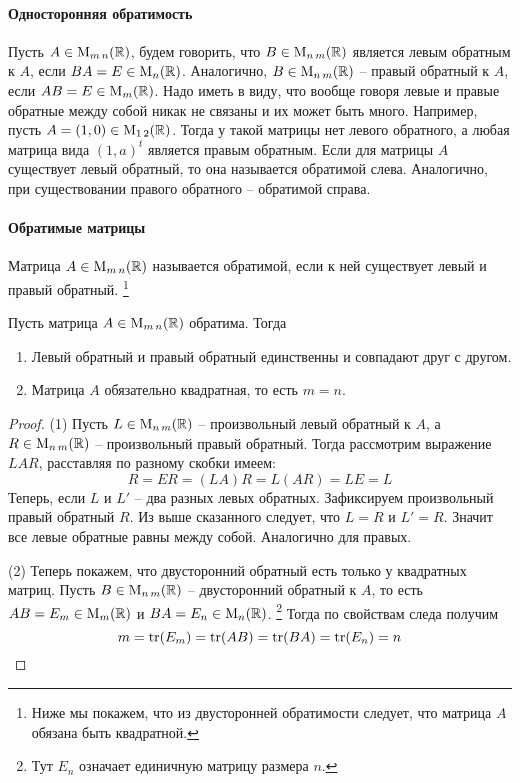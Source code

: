 \paragraph{Односторонняя обратимость}

Пусть $A\in\operatorname{M}_{m\,n}(\mathbb R)$, будем говорить, что $B\in\operatorname{M}_{n\,m}(\mathbb R)$ является левым обратным к $A$, если $BA = E\in\operatorname{M}_{n}(\mathbb R)$.
Аналогично, $B\in\operatorname{M}_{n\,m}(\mathbb R)$ -- правый обратный к $A$, если $AB = E\in\operatorname{M}_{m}(\mathbb R)$.
Надо иметь в виду, что вообще говоря левые и правые обратные между собой никак не связаны и их может быть много.
Например, пусть $A = (1, 0)\in\operatorname{M}_{1\,2}(\mathbb R)$.
Тогда у такой матрицы нет левого обратного, а любая матрица вида $(1, a)^t$ является правым обратным.
Если для матрицы $A$ существует левый обратный, то она называется обратимой слева.
Аналогично, при существовании правого обратного -- обратимой справа.

\paragraph{Обратимые матрицы}

Матрица $A\in\operatorname{M}_{m\,n}(\mathbb R)$ называется обратимой, если к ней существует левый и правый обратный.%
\footnote{Ниже мы покажем, что из двусторонней обратимости следует, что матрица $A$ обязана быть квадратной.}

\begin{claim}
Пусть матрица $A\in\operatorname{M}_{m\,n}(\mathbb R)$ обратима.
Тогда
\begin{enumerate}
\item Левый обратный и правый обратный единственны и совпадают друг с другом.

\item Матрица $A$ обязательно квадратная, то есть $m = n$.
\end{enumerate}
\end{claim}
\begin{proof}
(1) Пусть $L\in\operatorname{M}_{n\,m}(\mathbb R)$ -- произвольный левый обратный к $A$, а $R\in\operatorname{M}_{n\,m}(\mathbb R)$ -- произвольный правый обратный.
Тогда рассмотрим выражение $LAR$, расставляя по разному скобки имеем:
\[
R = ER = (LA)R = L (AR) = LE = L
\]
Теперь, если $L$ и $L'$ -- два разных левых обратных.
Зафиксируем произвольный правый обратный $R$.
Из выше сказанного следует, что $L = R$ и $L' = R$.
Значит все левые обратные равны между собой.
Аналогично для правых.

(2) Теперь покажем, что двусторонний обратный есть только у квадратных матриц.
Пусть $B\in \operatorname{M}_{n\,m}(\mathbb R)$ -- двусторонний обратный к $A$, то есть $AB = E_m\in\operatorname{M}_{m}(\mathbb R)$ и $BA = E_n\in \operatorname{M}_{n}(\mathbb R)$.%
\footnote{Тут $E_n$ означает единичную матрицу размера $n$.}
Тогда по свойствам следа получим
\[
m = \operatorname{tr}(E_m) = \operatorname{tr}(AB) = \operatorname{tr}(BA) = \operatorname{tr}(E_n) = n
\]
\end{proof}

